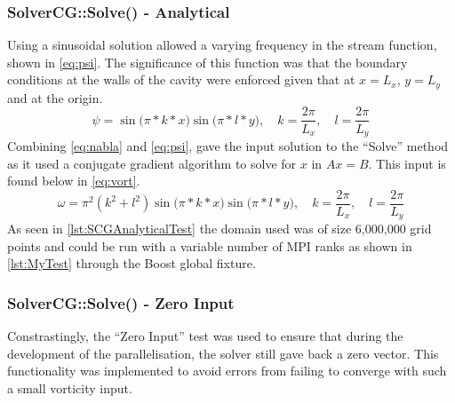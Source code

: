 \subsubsection{SolverCG::Solve() - Analytical}
Using a sinusoidal solution allowed a varying frequency in the stream function, shown in \eq\ref{eq:psi}.
The significance of this function was that the boundary conditions at the walls of the cavity were enforced given that at $x=L_x$, $y=L_y$ and at the origin.
\begin{equation}
    \psi = \sin\bigl(\pi * k * x\bigr)\sin\bigl(\pi * l * y\bigr),\quad k = \frac{2\pi}{L_x},\quad l = \frac{2\pi}{L_y}
    \label{eq:psi}
\end{equation}
Combining \eqs \ref{eq:nabla} and \ref{eq:psi}, gave the input solution to the ``Solve'' method as it used a conjugate gradient algorithm to solve for $x$ in $Ax=B$.
This input is found below in \eq\ref{eq:vort}.
\begin{equation}
    \omega = \pi^2(k^2+l^2)\sin\bigl(\pi * k * x\bigr)\sin\bigl(\pi * l * y\bigr),\quad k = \frac{2\pi}{L_x},\quad l = \frac{2\pi}{L_y}
    \label{eq:vort}
\end{equation}
As seen in \code\ref{lst:SCGAnalyticalTest} the domain used was of size 6,000,000 grid points and could be run with a variable number of MPI ranks as shown in \code\ref{lst:MyTest} through the Boost global fixture.
\subsubsection{SolverCG::Solve() - Zero Input}
Constrastingly, the ``Zero Input'' test was used to ensure that during the development of the parallelisation, the solver still gave back a zero vector.
This functionality  was implemented to avoid errors from failing to converge with such a small vorticity input.
